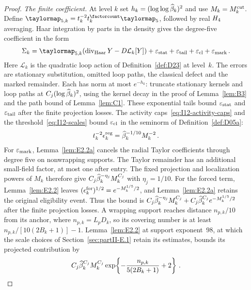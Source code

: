 \begin{proof}
\emph{The finite coefficient.} At level $k$ set $h_k=(\log\log\widehat{\beta}_k)^2$ and use $M_k=M^{\mathrm{cut}}_k$. Define $\taylormap_{5,k}=t_k^{-2}t_k^{\factorcount}\taylormap_5$, followed by real $H_4$ averaging. Haar integration by parts in the density gives the degree-five coefficient in the form
\begin{equation}\label{eq:I-five-pieces}
\Sigma_k=\taylormap_{5,k}(\operatorname{div}_{\rm Haar}Y-D\mathcal L_k[Y])
+\varepsilon_{\rm stat}+\varepsilon_{\rm tail}+\varepsilon_{\rm cl}+\varepsilon_{\rm mark}\,.
\end{equation}
Here $\mathcal L_k$ is the quadratic loop action of Definition~\ref{def:D23} at level~$k$. The errors are stationary substitution, omitted loop paths, the classical defect and the marked remainder. Each has norm at most $e^{-h_k}$: truncate stationary kernels and loop paths at $C_j(\log\widehat{\beta}_k)^2$, using the kernel decay in the proof of Lemma~\ref{lem:B3} and the path bound of Lemma~\ref{lem:C1}. These exponential tails bound $\varepsilon_{\rm stat}$ and $\varepsilon_{\rm tail}$ after the finite projection losses. The activity caps~\eqref{eq:I12-activity-caps} and the threshold~\eqref{eq:I12-scales} bound $\varepsilon_{\rm cl}$ in the seminorm of Definition~\ref{def:D05a}:
\begin{equation*}
 t_k^{-2}\epsilon_k^{\rm reg}=\widehat{\beta}_k^{-1/10}M_k^{-2}\,.
\end{equation*}
For $\varepsilon_{\rm mark}$, Lemma~\ref{lem:E2.2a} cancels the radial Taylor coefficients through degree five on nonwrapping supports. The Taylor remainder has an additional small-field factor, at most one after entry. The fixed projection and localization powers of $M_k$ therefore give $C_j\widehat{\beta}_k^{-\eta_j}M_k^{C_j}$ with $\eta_j=1/10$. For the forced term, Lemma~\ref{lem:E2.2} leaves $(\epsilon_k^{\rm for})^{1/2}=e^{-M_k^{1/5}/2}$, and Lemma~\ref{lem:E2.2a} retains the original eligibility event. Thus the bound is
$C_j\widehat{\beta}_k^{-\eta_j}M_k^{C_j}+C_j\widehat{\beta}_k^{C_j}e^{-M_k^{1/5}/2}$
after the finite projection losses. A wrapping support reaches distance $n_{p,k}/10$ from its anchor, where $n_{p,k}=L_pD_k$, so its covering number is at least $n_{p,k}/[10(2B_k+1)]-1$. Lemma~\ref{lem:E2.2} at support exponent~$98$, at which the scale choices of Section~\ref{sec:partII-E.1} retain its estimates, bounds its projected contribution by
\begin{equation*}
C_j\widehat{\beta}_k^{C_j}M_k^{C_j}
\exp\!\left\{-\frac{n_{p,k}}{5(2B_k+1)}+2\right\}\,.
\end{equation*}

\end{proof}
